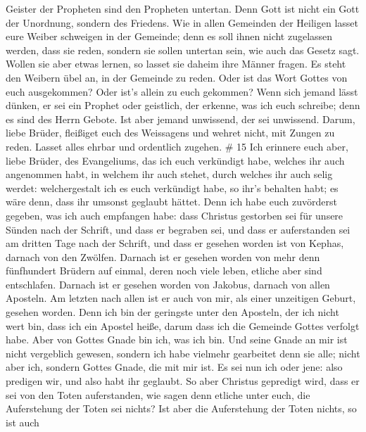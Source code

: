 Geister der Propheten sind den Propheten untertan.  Denn
Gott ist nicht ein Gott der Unordnung, sondern des Friedens.
 Wie in allen Gemeinden der Heiligen lasset eure Weiber
schweigen in der Gemeinde; denn es soll ihnen nicht zugelassen werden,
dass sie reden, sondern sie sollen untertan sein, wie auch das Gesetz
sagt.  Wollen sie aber etwas lernen, so lasset sie daheim
ihre Männer fragen. Es steht den Weibern übel an, in der Gemeinde zu
reden.  Oder ist das Wort Gottes von euch ausgekommen? Oder
ist's allein zu euch gekommen?  Wenn sich jemand lässt
dünken, er sei ein Prophet oder geistlich, der erkenne, was ich euch
schreibe; denn es sind des Herrn Gebote.  Ist aber jemand
unwissend, der sei unwissend.  Darum, liebe Brüder,
fleißiget euch des Weissagens und wehret nicht, mit Zungen zu reden.
 Lasset alles ehrbar und ordentlich zugehen. \# 15
 Ich erinnere euch aber, liebe Brüder, des Evangeliums, das
ich euch verkündigt habe, welches ihr auch angenommen habt, in welchem
ihr auch stehet,  durch welches ihr auch selig werdet:
welchergestalt ich es euch verkündigt habe, so ihr's behalten habt; es
wäre denn, dass ihr umsonst geglaubt hättet.  Denn ich habe
euch zuvörderst gegeben, was ich auch empfangen habe: dass Christus
gestorben sei für unsere Sünden nach der Schrift,  und dass
er begraben sei, und dass er auferstanden sei am dritten Tage nach der
Schrift,  und dass er gesehen worden ist von Kephas, darnach
von den Zwölfen.  Darnach ist er gesehen worden von mehr
denn fünfhundert Brüdern auf einmal, deren noch viele leben, etliche
aber sind entschlafen.  Darnach ist er gesehen worden von
Jakobus, darnach von allen Aposteln.  Am letzten nach allen
ist er auch von mir, als einer unzeitigen Geburt, gesehen worden.
 Denn ich bin der geringste unter den Aposteln, der ich
nicht wert bin, dass ich ein Apostel heiße, darum dass ich die Gemeinde
Gottes verfolgt habe.  Aber von Gottes Gnade bin ich, was
ich bin. Und seine Gnade an mir ist nicht vergeblich gewesen, sondern
ich habe vielmehr gearbeitet denn sie alle; nicht aber ich, sondern
Gottes Gnade, die mit mir ist.  Es sei nun ich oder jene:
also predigen wir, und also habt ihr geglaubt.  So aber
Christus gepredigt wird, dass er sei von den Toten auferstanden, wie
sagen denn etliche unter euch, die Auferstehung der Toten sei nichts?
 Ist aber die Auferstehung der Toten nichts, so ist auch
